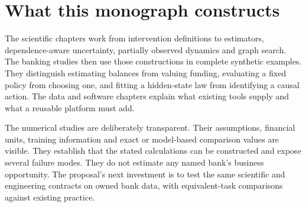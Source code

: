 \section{What this monograph constructs}
The scientific chapters work from intervention definitions to estimators,
dependence-aware uncertainty, partially observed dynamics and graph search.
The banking studies then use those constructions in complete synthetic
examples. They distinguish estimating balances from valuing funding,
evaluating a fixed policy from choosing one, and fitting a hidden-state law
from identifying a causal action. The data and software chapters explain
what existing tools supply and what a reusable platform must add.

The numerical studies are deliberately transparent. Their assumptions,
financial units, training information and exact or model-based comparison
values are visible. They establish that the stated calculations can be
constructed and expose several failure modes. They do not estimate any
named bank's business opportunity. The proposal's next investment is to
test the same scientific and engineering contracts on owned bank data,
with equivalent-task comparisons against existing practice.
